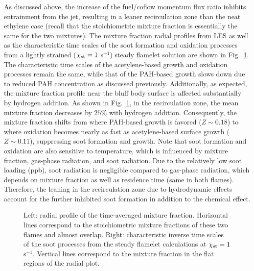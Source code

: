 \documentclass[review,3p,times]{elsarticle}
\begin{document}
As discussed above, the increase of the fuel/coflow momentum flux ratio inhibits entrainment from the jet, resulting in a leaner recirculation zone than the neat ethylene case (recall that the stoichiometric mixture fraction is essentially the same for the two mixtures).  The mixture fraction radial profiles from LES as well as the characteristic time scales of the soot formation and oxidation processes from a lightly strained ($\chi_{\rm st} = 1$ s$^{-1}$) steady flamelet solution are shown in Fig.~\ref{fig:timescale}.  The characteristic time scales of the acetylene-based growth and oxidation processes remain the same, while that of the PAH-based growth slows down due to reduced PAH concentration as discussed previously.  Additionally, as expected, the mixture fraction profile near the bluff body surface is affected substantially by hydrogen addition.  As shown in Fig.~\ref{fig:timescale}, in the recirculation zone, the mean mixture fraction decreases by $25$\% with hydrogen addition.  Consequently, the mixture fraction shifts from where PAH-based growth is favored ($Z \sim 0.18$) to where oxidation becomes nearly as fast as acetylene-based surface growth ($Z \sim 0.11$), suppressing soot formation and growth.  Note that soot formation and oxidation are also sensitive to temperature, which is influenced by mixture fraction, gas-phase radiation, and soot radiation.  Due to the relatively low soot loading (ppb), soot radiation is negligible compared to gas-phase radiation, which depends on mixture fraction as well as residence time (same in both flames).  Therefore, the leaning in the recirculation zone due to hydrodynamic effects account for the further inhibited soot formation in addition to the chemical effect.

\begin{figure}[t]
  \centering
  \scriptsize
  \resizebox{0.49\textwidth}{!}{}
  \resizebox{0.49\textwidth}{!}{}
  \vspace{-0.3in}
  \normalsize
  \caption{Left: radial profile of the time-averaged mixture fraction.  Horizontal lines correspond to the stoichiometric mixture fractions of these two flames and almost overlap.  Right: characteristic inverse time scales of the soot processes from the steady flamelet calculations at $\chi_{\rm st} = 1$ s$^{-1}$.  Vertical lines correspond to the mixture fraction in the flat regions of the radial plot.}
  \label{fig:timescale}
\end{figure}
\end{document}

